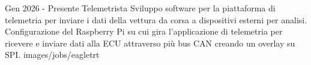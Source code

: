 {Gen 2026 - Presente}
{Telemetrista}
{Sviluppo software per la piattaforma di telemetria 
per inviare i dati della vettura da corsa a dispositivi esterni 
per analisi.
Configurazione del Raspberry Pi su cui gira l'applicazione di telemetria
per ricevere e inviare dati alla ECU attraverso più bus CAN creando
un overlay su SPI.}
{images/jobs/eagletrt}
